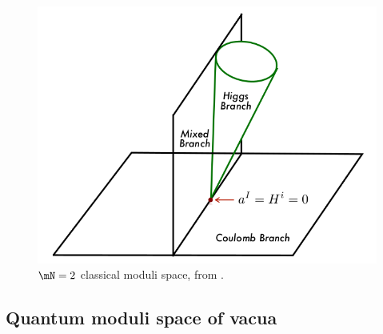 \documentclass{worksheetclass}
\begin{document}
        \begin{figure}[H]
            \centering
            \includegraphics[scale=0.35]{Pictures/classicalmodulispace.png}
            \caption{$\mN=2$ classical moduli space, from \cite{bertolinisusy}.}
        \end{figure}

    \subsection{Quantum moduli space of vacua}
\end{document}
